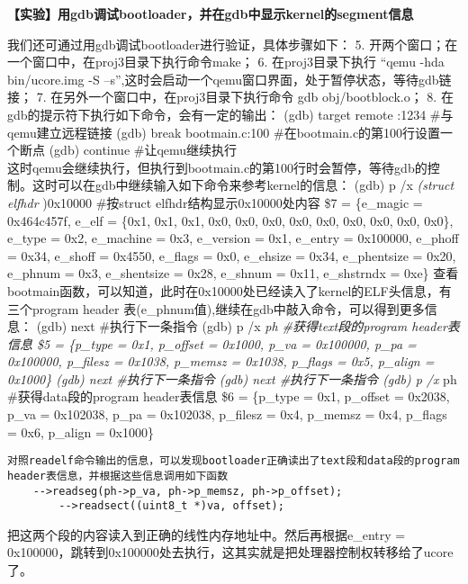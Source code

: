 \textbf{【实验】用gdb调试bootloader，并在gdb中显示kernel的segment信息}

我们还可通过用gdb调试bootloader进行验证，具体步骤如下： 5.
开两个窗口；在一个窗口中，在proj3目录下执行命令make； 6.
在proj3目录下执行 ``qemu -hda bin/ucore.img -S
--s'',这时会启动一个qemu窗口界面，处于暂停状态，等待gdb链接； 7.
在另外一个窗口中，在proj3目录下执行命令 gdb obj/bootblock.o； 8.
在gdb的提示符下执行如下命令，会有一定的输出： (gdb) target remote :1234
\#与qemu建立远程链接 (gdb) break bootmain.c:100
\#在bootmain.c的第100行设置一个断点 (gdb) continue \#让qemu继续执行\\
这时qemu会继续执行，但执行到bootmain.c的第100行时会暂停，等待gdb的控制。这时可以在gdb中继续输入如下命令来参考kernel的信息：
(gdb) p /x \emph{(struct elfhdr })0x10000 \#按struct
elfhdr结构显示0x10000处内容 \$7 = \{e\_magic = 0x464c457f, e\_elf =
\{0x1, 0x1, 0x1, 0x0, 0x0, 0x0, 0x0, 0x0, 0x0, 0x0, 0x0, 0x0\}, e\_type
= 0x2, e\_machine = 0x3, e\_version = 0x1, e\_entry = 0x100000, e\_phoff
= 0x34, e\_shoff = 0x4550, e\_flags = 0x0, e\_ehsize = 0x34,
e\_phentsize = 0x20, e\_phnum = 0x3, e\_shentsize = 0x28, e\_shnum =
0x11, e\_shstrndx = 0xe\}
查看bootmain函数，可以知道，此时在0x10000处已经读入了kernel的ELF头信息，有三个program
header 表(e\_phnum值),继续在gdb中敲入命令，可以得到更多信息： (gdb) next
\#执行下一条指令 (gdb) p /x \emph{ph \#获得text段的program header表信息
\$5 = \{p\_type = 0x1, p\_offset = 0x1000, p\_va = 0x100000, p\_pa =
0x100000, p\_filesz = 0x1038, p\_memsz = 0x1038, p\_flags = 0x5,
p\_align = 0x1000\} (gdb) next \#执行下一条指令 (gdb) next
\#执行下一条指令 (gdb) p /x }ph \#获得data段的program header表信息 \$6 =
\{p\_type = 0x1, p\_offset = 0x2038, p\_va = 0x102038, p\_pa = 0x102038,
p\_filesz = 0x4, p\_memsz = 0x4, p\_flags = 0x6, p\_align = 0x1000\}

\begin{lstlisting}
对照readelf命令输出的信息，可以发现bootloader正确读出了text段和data段的program header表信息，并根据这些信息调用如下函数
    -->readseg(ph->p_va, ph->p_memsz, ph->p_offset);
        -->readsect((uint8_t *)va, offset);
\end{lstlisting}

把这两个段的内容读入到正确的线性内存地址中。然后再根据e\_entry =
0x100000，跳转到0x100000处去执行，这其实就是把处理器控制权转移给了ucore了。
